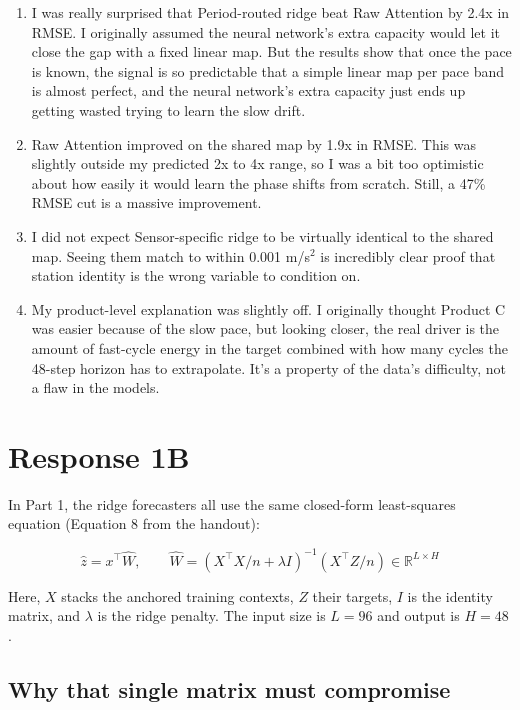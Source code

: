 \documentclass[11pt,letterpaper]{article}
\begin{document}
\begin{enumerate}
    \item I was really surprised that Period-routed ridge beat Raw Attention by 2.4x in RMSE. I originally assumed the neural network's extra capacity would let it close the gap with a fixed linear map. But the results show that once the pace is known, the signal is so predictable that a simple linear map per pace band is almost perfect, and the neural network's extra capacity just ends up getting wasted trying to learn the slow drift.
    \item Raw Attention improved on the shared map by 1.9x in RMSE. This was slightly outside my predicted 2x to 4x range, so I was a bit too optimistic about how easily it would learn the phase shifts from scratch. Still, a 47\% RMSE cut is a massive improvement.
    \item I did not expect Sensor-specific ridge to be {virtually identical} to the shared map. Seeing them match to within 0.001 m/s$^2$ is incredibly clear proof that station identity is the wrong variable to condition on.
    \item My product-level explanation was slightly off. I originally thought Product C was easier because of the slow pace, but looking closer, the real driver is the amount of fast-cycle energy in the target combined with how many cycles the 48-step horizon has to extrapolate. It's a property of the data's difficulty, not a flaw in the models.
\end{enumerate}

\newpage


\section*{Response 1B}

In Part 1, the ridge forecasters all use the same closed-form least-squares equation (Equation 8 from the handout):

\begin{equation*}
\hat{z} = x^{\top}\hat{W},
\qquad
\hat{W} = \left(X^{\top}X/n + \lambda I\right)^{-1}\left(X^{\top}Z/n\right)
\in \mathbb{R}^{L\times H}
\end{equation*}

Here, $X$ stacks the anchored training contexts, $Z$ their targets, $I$ is the identity matrix, and $\lambda$ is the ridge penalty. The input size is $L=96$ and output is $H=48$.

\subsection*{Why that single matrix must compromise}
\end{document}
